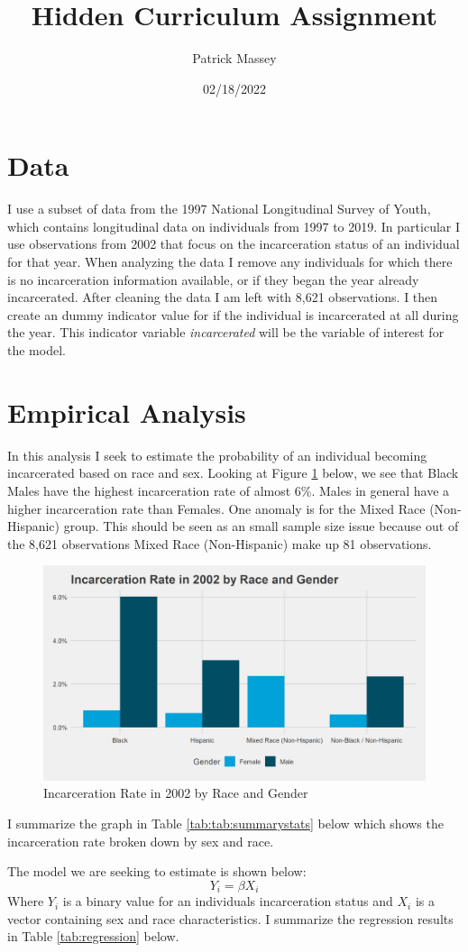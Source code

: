 \documentclass{article}
\author{Patrick Massey}
\title{Hidden Curriculum Assignment}
\date{02/18/2022}
\begin{document}
\maketitle

\section*{Data}
I use a subset of data from the 1997 National Longitudinal Survey of Youth, which contains longitudinal data on individuals from 1997 to 2019. In particular I use observations from 2002 that focus on the incarceration status of an individual for that year. When analyzing the data I remove any individuals for which there is no incarceration information available, or if they began the year already incarcerated. After cleaning the data I am left with 8,621 observations. I then create an dummy indicator value for if the individual is incarcerated at all during the year. This indicator variable \textit{incarcerated} will be the variable of interest for the model.
\newpage
\section*{Empirical Analysis} 
In this analysis I seek to estimate the probability of an individual becoming incarcerated based on race and sex. Looking at Figure \ref{fig:graph} below, we see that Black Males have the highest incarceration rate of almost 6\%. Males in general have a higher incarceration rate than Females. One anomaly is for the Mixed Race (Non-Hispanic) group. This should be seen as an small sample size issue because out of the 8,621 observations Mixed Race (Non-Hispanic) make up 81 observations.
\begin{figure}[H]
    \begin{center}
        \includegraphics[width=.85\textwidth]{incarceration_rate_by_racegender}
    \end{center}
    \caption{Incarceration Rate in 2002 by Race and Gender}
    \label{fig:graph}
\end{figure}
I summarize the graph in Table \ref{tab:tab:summarystats} below which shows the incarceration rate broken down by sex and race.

\newpage
The model we are seeking to estimate is shown below:
\begin{equation*}
Y_i = \beta X_i 
\end{equation*}
Where $Y_i$ is a binary value for an individuals incarceration status and $X_i$ is a vector containing sex and race characteristics. I summarize the regression results in Table \ref{tab:regression} below.
\end{document}
